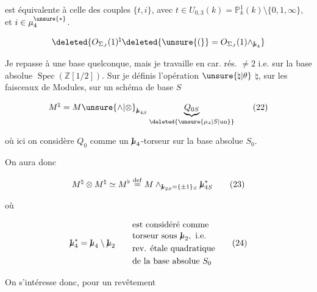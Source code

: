 
est équivalente à celle des couples $\{t,i\}$, avec $t\in U_{0,3}(k)=\mathbb P^1_k(k)\setminus\{0,1,\infty\}$, et $i\in\mu_4^{\unsure{*}}$.


\[
\deleted{O_{\Sigma_J}(1)^{\natural}\deleted{\unsure{(}}=O_{\Sigma_J}(1)\wedge_{\mathord{\mathrm{I}\mkern-7mu\mu}_4}}
\]

Je repasse à une base quelconque, mais je travaille en car. rés. $\ne 2$ i.e. sur la base absolue $\operatorname{Spec}(\mathbb Z[1/2])$. Sur  je définis l'opération $\unsure{\natural|\theta}$ $\natural$, sur les  faisceaux de Modules,  sur un schéma de base $S$

\[
M^\natural=M\unsure{\wedge|\otimes}_{\mathord{\mathrm{I}\mkern-7mu\mu}_{4S}}\underbrace{Q_{0S}}_{\deleted{\unsure{\mu_4|S|\text{un}}}}
\tag*{(22)}
\]


où ici on considère $Q_0$ comme un $\mathord{\mathrm{I}\mkern-7mu\mu}_4$-torseur sur la base absolue $S_0$.

On aura donc

\[
M^\natural\otimes M^\natural\simeq M^\flat\overset{\mathrm{def}}{=}M\wedge_{\mathord{\mathrm{I}\mkern-7mu\mu}_{2S}=\{\pm1\}_S}\mathord{\mathrm{I}\mkern-7mu\mu}_{4S}^*
\tag*{(23)}
\]

où 

\[
\mathord{\mathrm{I}\mkern-7mu\mu}_4^*=\mathord{\mathrm{I}\mkern-7mu\mu}_4\setminus\mathord{\mathrm{I}\mkern-7mu\mu}_2
\qquad\begin{aligned}
&\text{est considéré comme}\\[-2pt]
&\text{torseur sous }\mathord{\mathrm{I}\mkern-7mu\mu}_2,\ \text{i.e.}\\
&\text{rev. étale quadratique}\\
&\text{de la base absolue }S_0
\end{aligned}
\tag*{(24)}
\]

On s'intéresse donc,  pour un revêtement
